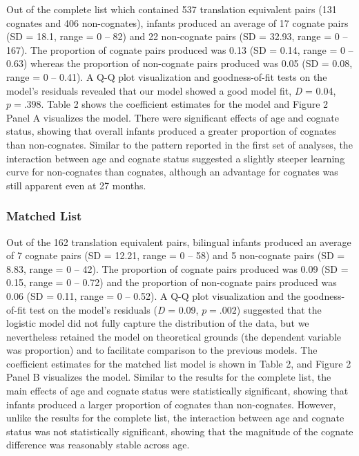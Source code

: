 \documentclass[
  ,man,floatsintext]{apa6}
\begin{document}
Out of the complete list which contained 537 translation equivalent pairs (131 cognates and 406 non-cognates), infants produced an average of 17 cognate pairs (SD = 18.1, range = 0 -- 82) and 22 non-cognate pairs (SD = 32.93, range = 0 -- 167). The proportion of cognate pairs produced was 0.13 (SD = 0.14, range = 0 -- 0.63) whereas the proportion of non-cognate pairs produced was 0.05 (SD = 0.08, range = 0 -- 0.41). A Q-Q plot visualization and goodness-of-fit tests on the model's residuals revealed that our model showed a good model fit, \emph{D} = 0.04, \(p = .398\). Table 2 shows the coefficient estimates for the model and Figure 2 Panel A visualizes the model. There were significant effects of age and cognate status, showing that overall infants produced a greater proportion of cognates than non-cognates. Similar to the pattern reported in the first set of analyses, the interaction between age and cognate status suggested a slightly steeper learning curve for non-cognates than cognates, although an advantage for cognates was still apparent even at 27 months.

\hypertarget{matched-list-1}{%
\subsubsection{Matched List}\label{matched-list-1}}

Out of the 162 translation equivalent pairs, bilingual infants produced an average of 7 cognate pairs (SD = 12.21, range = 0 -- 58) and 5 non-cognate pairs (SD = 8.83, range = 0 -- 42). The proportion of cognate pairs produced was 0.09 (SD = 0.15, range = 0 -- 0.72) and the proportion of non-cognate pairs produced was 0.06 (SD = 0.11, range = 0 -- 0.52). A Q-Q plot visualization and the goodness-of-fit test on the model's residuals (\emph{D} = 0.09, \(p = .002\)) suggested that the logistic model did not fully capture the distribution of the data, but we nevertheless retained the model on theoretical grounds (the dependent variable was proportion) and to facilitate comparison to the previous models. The coefficient estimates for the matched list model is shown in Table 2, and Figure 2 Panel B visualizes the model. Similar to the results for the complete list, the main effects of age and cognate status were statistically significant, showing that infants produced a larger proportion of cognates than non-cognates. However, unlike the results for the complete list, the interaction between age and cognate status was not statistically significant, showing that the magnitude of the cognate difference was reasonably stable across age.
\end{document}
